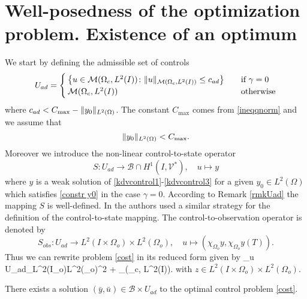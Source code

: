 \section{Well-posedness of the optimization problem. Existence of an optimum}\label{sec:ex opt}
We start by defining the admissible set of controls
$$U_{ad} = \begin{cases} \left\{u \in \mathcal{M}(\Omega_c, L^{2}(I))\colon \lVert u\rVert_{\mathcal{M}(\Omega_c, L^{2}(I))}\leq c_{ad} \right\} &\quad\mbox{if } \gamma = 0 \\
\mathcal{M}(\Omega_c, L^{2}(I)) & \quad \mbox{otherwise}
 \end{cases}$$
where $c_{ad}< C_{\max}-\lVert y_0\rVert_{L^2(\Omega)}$. The constant $C_{\max}$ comes from \eqref{ineqqnorm} and we assume that
\begin{equation}\label{constr y0}
\norm{y_0}_{L^2(\Omega)}< C_{\max}.
\end{equation}
Moreover we introduce the non-linear control-to-state operator
\begin{equation}
 S\colon U_{ad}\rightarrow \mathcal B\cap H^1(I,\mathcal V^\ast),\quad u\mapsto y
 \label{controltostate}
\end{equation}
where $y$ is a weak solution of \eqref{kdvcontrol1}-\eqref{kdvcontrol3} for a given $y_0\in L^2(\Omega)$ which satisfies
\eqref{constr y0} in the case $\gamma =0$. According to Remark \ref{rmkUad} the mapping $S$ is well-defined. In \cite{ClasonKaltenbacher13} the authors used a similar strategy for the definition of the control-to-state mapping. The control-to-observation operator is denoted by
\[
S_{obs}\colon U_{ad}\rightarrow L^2(I\times \Omega_{o})\times L^2(\Omega_{o}),\quad u\mapsto(\chi_{\Omega_{o}}y,\chi_{\Omega_{o}}y(T)).
\]
Thus we can rewrite problem \eqref{cost} in its reduced form given by
\be
\min_{u \in U_{ad}}_{L^2(I\times \Omega_{o})\times L^2(\Omega_{o})}^2 + \alpha {}_{(\Omega_{c}, L^{2}(I))}.
\label{red cost}
\ee
with $z\in L^2(I\times \Omega_{o})\times L^2(\Omega_{o})$.
\begin{proposition}
There exists a solution $(\bar y,\bar u) \in \mathcal B\times U_{ad}$ to the optimal control problem \eqref{cost}.
\end{proposition}
